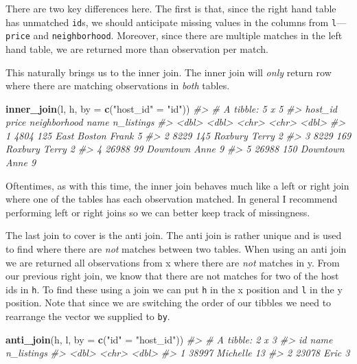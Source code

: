 \documentclass[
]{book}
\newenvironment{Shaded}{\begin{snugshade}}{\end{snugshade}}
\newcommand{\CommentTok}[1]{\textcolor[rgb]{0.56,0.35,0.01}{\textit{#1}}}
\newcommand{\DataTypeTok}[1]{\textcolor[rgb]{0.13,0.29,0.53}{#1}}
\newcommand{\KeywordTok}[1]{\textcolor[rgb]{0.13,0.29,0.53}{\textbf{#1}}}
\newcommand{\NormalTok}[1]{#1}
\newcommand{\StringTok}[1]{\textcolor[rgb]{0.31,0.60,0.02}{#1}}
\begin{document}
There are two key differences here. The first is that, since the right hand table has unmatched \texttt{id}s, we should anticipate missing values in the columns from \texttt{l}---\texttt{price} and \texttt{neighborhood}. Moreover, since there are multiple matches in the left hand table, we are returned more than observation per match.

This naturally brings us to the inner join. The inner join will \emph{only} return row where there are matching observations in \emph{both} tables.

\begin{Shaded}
\begin{Highlighting}[]
\KeywordTok{inner\_join}\NormalTok{(l, h, }\DataTypeTok{by =} \KeywordTok{c}\NormalTok{(}\StringTok{"host\_id"}\NormalTok{ =}\StringTok{ "id"}\NormalTok{))}
\CommentTok{\#\textgreater{} \# A tibble: 5 x 5}
\CommentTok{\#\textgreater{}   host\_id price neighborhood name  n\_listings}
\CommentTok{\#\textgreater{}     \textless{}dbl\textgreater{} \textless{}dbl\textgreater{} \textless{}chr\textgreater{}        \textless{}chr\textgreater{}      \textless{}dbl\textgreater{}}
\CommentTok{\#\textgreater{} 1    4804   125 East Boston  Frank          5}
\CommentTok{\#\textgreater{} 2    8229   145 Roxbury      Terry          2}
\CommentTok{\#\textgreater{} 3    8229   169 Roxbury      Terry          2}
\CommentTok{\#\textgreater{} 4   26988    99 Downtown     Anne           9}
\CommentTok{\#\textgreater{} 5   26988   150 Downtown     Anne           9}
\end{Highlighting}
\end{Shaded}

Oftentimes, as with this time, the inner join behaves much like a left or right join where one of the tables has each observation matched. In general I recommend performing left or right joins so we can better keep track of missingness.

The last join to cover is the anti join. The anti join is rather unique and is used to find where there are \emph{not} matches between two tables. When using an anti join we are returned all observations from x where there are \emph{not} matches in y. From our previous right join, we know that there are not matches for two of the host ids in \texttt{h}. To find these using a join we can put \texttt{h} in the x position and \texttt{l} in the y position. Note that since we are switching the order of our tibbles we need to rearrange the vector we supplied to \texttt{by}.

\begin{Shaded}
\begin{Highlighting}[]
\KeywordTok{anti\_join}\NormalTok{(h, l, }\DataTypeTok{by =} \KeywordTok{c}\NormalTok{(}\StringTok{"id"}\NormalTok{ =}\StringTok{ "host\_id"}\NormalTok{))}
\CommentTok{\#\textgreater{} \# A tibble: 2 x 3}
\CommentTok{\#\textgreater{}      id name     n\_listings}
\CommentTok{\#\textgreater{}   \textless{}dbl\textgreater{} \textless{}chr\textgreater{}         \textless{}dbl\textgreater{}}
\CommentTok{\#\textgreater{} 1 38997 Michelle         13}
\CommentTok{\#\textgreater{} 2 23078 Eric              3}
\end{Highlighting}
\end{Shaded}
\end{document}
